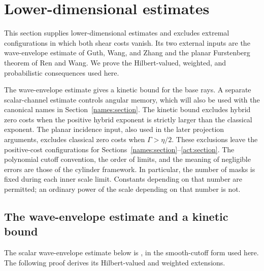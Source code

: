 \section{Lower-dimensional estimates}\label{sec:low}

This section supplies lower-dimensional estimates and excludes extremal
configurations in which both shear costs vanish. Its two external inputs
are the wave-envelope estimate of Guth, Wang, and Zhang and the planar
Furstenberg theorem of Ren and Wang. We prove the Hilbert-valued,
weighted, and probabilistic consequences used here.

The wave-envelope estimate gives a kinetic bound for the base rays.
A separate scalar-channel estimate controls angular memory, which will
also be used with the canonical names in Section~\ref{names:section}.
The kinetic bound excludes hybrid zero costs when the positive hybrid
exponent is strictly larger than the classical exponent. The planar incidence input,
also used in the later projection arguments, excludes classical zero
costs when $\Gamma>\eta/2$. These exclusions leave the positive-cost
configurations for Sections~\ref{names:section}--\ref{act:section}.
The polynomial cutoff convention, the order of
limits, and the meaning of negligible errors are those of the cylinder
framework. In particular, the number of masks is fixed during each inner
scale limit.
Constants depending on that number are permitted; an ordinary power of
the scale depending on that number is not.

\subsection{The wave-envelope estimate and a kinetic bound}

The scalar wave-envelope estimate below is
\cite[Theorem~1.3]{GuthWangZhang2020}, in the smooth-cutoff form used here.
The following proof derives its Hilbert-valued and weighted extensions.

